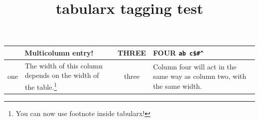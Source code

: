 \documentclass{article}
\title{tabularx tagging test}
\begin{document}
\begin{tabularx}{250pt}{|c|X|c|X|}
\hline
\multicolumn{2}{|c|}{Multicolumn entry!}&
THREE&
FOUR \verb*|ab c$#^|\\
\hline
one&
\raggedright\arraybackslash The width of this column depends on the
width of the table.\footnote
{You can now use {\ttfamily footnote} inside {\ttfamily
tabularx}!}&
three&
\raggedright\arraybackslash Column four will act in the same way as
column two, with the same width.\\
\hline
\end{tabularx}
\end{document}
